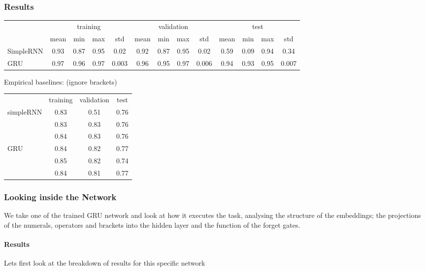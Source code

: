 \documentclass{article}
\begin{document}
\subsubsection{Results}

\begin{table}[!h]
\begin{tabular}{l|cccc|cccc|cccc}
            & \multicolumn{4}{c}{training} & \multicolumn{4}{c}{validation} & \multicolumn{4}{c}{test}\\
            & mean & min & max & std & mean & min & max & std & mean & min & max & std \\ 
\hline
SimpleRNN   & 0.93 & 0.87 & 0.95 & 0.02 & 0.92 & 0.87 & 0.95 & 0.02 & 0.59 & 0.09 & 0.94 & 0.34\\ 
GRU         & 0.97 & 0.96 & 0.97 & 0.003 & 0.96 & 0.95 & 0.97 & 0.006 & 0.94 & 0.93 & 0.95 & 0.007\\      
\end{tabular}
\end{table}

Empirical baselines: (ignore brackets)

\begin{tabular}{|l|ccc|}
    \hline
    & training & validation & test\\
simpleRNN & 0.83 & 0.51 & 0.76\\
& 0.83 & 0.83 & 0.76\\
& 0.84 & 0.83 & 0.76\\
\hline
GRU & 0.84 & 0.82 & 0.77\\
& 0.85 & 0.82 & 0.74\\
& 0.84 & 0.81 & 0.77\\
\hline
\end{tabular}

\subsubsection{Looking inside the Network}

We take one of the trained GRU network and look at how it executes the task, analysing the structure of the embeddings; the projections of the numerals, operators and brackets into the hidden layer and the function of the forget gates.\\
\paragraph{Results} Lets first look at the breakdown of results for this specific network
\end{document}
